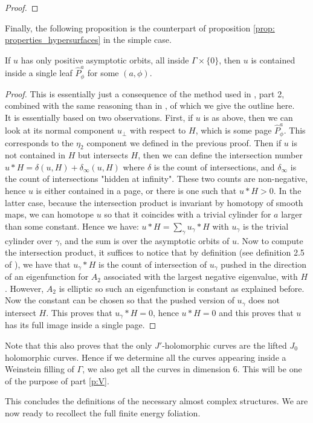 \documentclass[../main.tex]{subfiles}
\begin{document}
\begin{proof}
\end{proof}

Finally, the following proposition is the counterpart of proposition \ref{prop: properties_hypersurfaces} in the simple case. 

\begin{proposition}
If $u$ has only positive asymptotic orbits, all inside $\Gamma\times \{0\}$, then $u$ is contained inside a single leaf $\hat{P}_\phi^a$ for some $(a,\phi)$.
\end{proposition}

\begin{proof}
This is essentially just a consequence of the method used in \cite{zhou_unknottedness_2025}, part 2, combined with the same reasoning than in \cite{roux_cas_nodate}, of which we give the outline here.\\
It is essentially based on two observations. First, if $u$ is as above, then we can look at its normal component $u_\perp$ with respect to $H$, which is some page $\hat{P}_\phi^a$. This corresponds to the $\eta_2$ component we defined in the previous proof. Then if $u$ is not contained in $H$ but intersects $H$, then we can define the intersection number $u* H = \delta(u,H) + \delta_\infty(u,H)$ where $\delta$ is the count of intersections, and $\delta_\infty$ is the count of intersections "hidden at infinity". These two counts are non-negative, hence $u$ is either contained in a page, or there is one such that $u*H > 0$. In the latter case, because the intersection product is invariant by homotopy of smooth maps, we can homotope $u$ so that it coincides with a trivial cylinder for $a$ larger than some constant. Hence we have: $u*H = \sum_\gamma u_\gamma*H$ with $u_\gamma$ is the trivial cylinder over $\gamma$, and the sum is over the asymptotic orbits of $u$. Now to compute the intersection product, it suffices to notice that by definition (see definition 2.5 of \cite{zhou_unknottedness_2025}), we have that $u_\gamma*H$ is the count of intersection of $u_\gamma$ pushed in the direction of an eigenfunction for $A_2$ associated with the largest negative eigenvalue, with $H$. However, $A_2$ is elliptic so such an eigenfunction is constant as explained before. Now the constant can be chosen so that the pushed version of $u_\gamma$ does not intersect $H$. This proves that $u_\gamma*H = 0$, hence $u*H = 0$ and this proves that $u$ has its full image inside a single page.  
\end{proof}

\begin{remark}
Note that this also proves that the only $J'$-holomorphic curves are the lifted $J_0$ holomorphic curves. Hence if we determine all the curves appearing inside a Weinstein filling of $\Gamma$, we also get all the curves in dimension $6$. This will be one of the purpose of part \ref{p:V}. 
\end{remark}

This concludes the definitions of the necessary almost complex structures. We are now ready to recollect the full finite energy foliation. 
\end{document}
